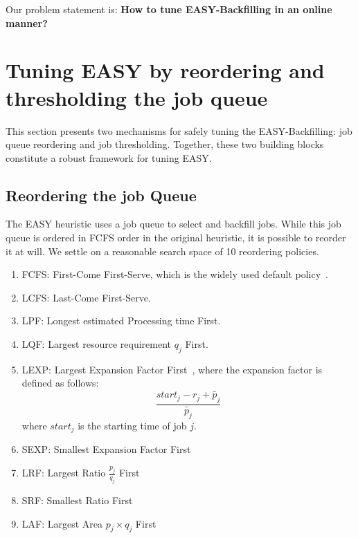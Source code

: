 \documentclass[sigconf]{acmart}
\begin{document}
Our problem statement is: \textbf{How to tune EASY-Backfilling in an online manner?}

\section{Tuning EASY by reordering and thresholding the job queue}
\label{sec:framework}

This section presents two mechanisms for safely tuning the EASY-Backfilling:
job queue reordering and job thresholding. Together, these two building blocks
constitute a robust framework for tuning EASY.

\subsection{Reordering the job Queue}

The EASY heuristic uses a job queue to select and backfill jobs. While this job
queue is ordered in FCFS order in the original heuristic, it is possible to
reorder it at will. We settle on a reasonable search space of 10 reordering policies.

\begin{enumerate}
  \item FCFS: First-Come First-Serve, which is the widely used default policy~\cite{easy}.
  \item LCFS: Last-Come First-Serve.
  \item LPF: Longest estimated Processing time First.
  \item LQF: Largest resource requirement $q_j$ First.
  \item LEXP: Largest Expansion Factor First~\cite{bfchar}, where the expansion
    factor is defined as follows:
  \begin{equation} \frac{start_j - r_j + \widetilde{p_j}}{\widetilde{p_j}} \end{equation}
  where $start_j$ is the starting time of job $j$.
  \item SEXP: Smallest Expansion Factor First
  \item LRF: Largest Ratio $\frac{p_j}{q_j}$ First
  \item SRF: Smallest Ratio First
  \item LAF: Largest Area $ p_j \times q_j$ First
\end{enumerate}
\end{document}
